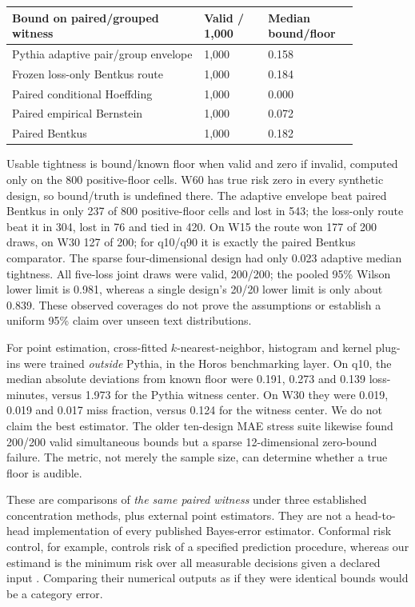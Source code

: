 \documentclass[11pt,a4paper]{article}
\begin{document}
\begin{center}
\small
\begin{tabular}{p{0.48\linewidth}p{0.16\linewidth}p{0.22\linewidth}}
\toprule
Bound on paired/grouped witness & Valid / 1,000 & Median bound/floor\\
\midrule
Pythia adaptive pair/group envelope & 1,000 & 0.158\\
Frozen loss-only Bentkus route & 1,000 & 0.184\\
Paired conditional Hoeffding & 1,000 & 0.000\\
Paired empirical Bernstein & 1,000 & 0.072\\
Paired Bentkus & 1,000 & 0.182\\
\bottomrule
\end{tabular}
\normalsize
\end{center}

Usable tightness is bound/known floor when valid and zero if invalid, computed only on the 800 positive-floor cells. W60 has true risk zero in every synthetic design, so bound/truth is undefined there. The adaptive envelope beat paired Bentkus in only 237 of 800 positive-floor cells and lost in 543; the loss-only route beat it in 304, lost in 76 and tied in 420. On W15 the route won 177 of 200 draws, on W30 127 of 200; for q10/q90 it is exactly the paired Bentkus comparator. The sparse four-dimensional design had only 0.023 adaptive median tightness. All five-loss joint draws were valid, 200/200; the pooled 95\% Wilson lower limit is 0.981, whereas a single design's 20/20 lower limit is only about 0.839. These observed coverages do not prove the assumptions or establish a uniform 95\% claim over unseen text distributions.

For point estimation, cross-fitted $k$-nearest-neighbor, histogram and kernel plug-ins were trained \emph{outside} Pythia, in the Horos benchmarking layer. On q10, the median absolute deviations from known floor were 0.191, 0.273 and 0.139 loss-minutes, versus 1.973 for the Pythia witness center. On W30 they were 0.019, 0.019 and 0.017 miss fraction, versus 0.124 for the witness center. We do not claim the best estimator. The older ten-design MAE stress suite likewise found 200/200 valid simultaneous bounds but a sparse 12-dimensional zero-bound failure. The metric, not merely the sample size, can determine whether a true floor is audible.

These are comparisons of \emph{the same paired witness} under three established concentration methods, plus external point estimators. They are not a head-to-head implementation of every published Bayes-error estimator. Conformal risk control, for example, controls risk of a specified prediction procedure, whereas our estimand is the minimum risk over all measurable decisions given a declared input \cite{crc}. Comparing their numerical outputs as if they were identical bounds would be a category error.
\end{document}
